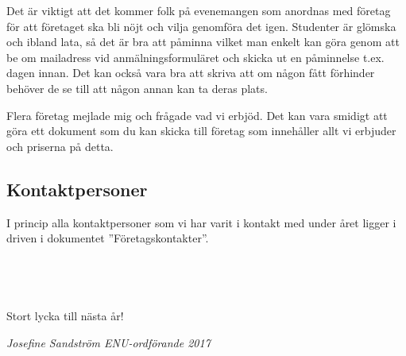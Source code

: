 \documentclass[10pt]{article}
\begin{document}
Det är viktigt att det kommer folk på evenemangen som anordnas med företag för att företaget ska
bli nöjt och vilja genomföra det igen. Studenter är glömska och ibland lata, så det är bra att påminna
vilket man enkelt kan göra genom att be om mailadress vid anmälningsformuläret och skicka ut en
påminnelse t.ex. dagen innan. Det kan också vara bra att skriva att om någon fått förhinder behöver
de se till att någon annan kan ta deras plats.

Flera företag mejlade mig och frågade vad vi erbjöd. Det kan vara smidigt att göra ett dokument som du kan skicka till företag som innehåller allt vi erbjuder och priserna på detta.

\subsection*{Kontaktpersoner}
I princip alla kontaktpersoner som vi har varit i kontakt med under året ligger i driven i dokumentet ''Företagskontakter''.\\
\\
\\
\\
\\

Stort lycka till nästa år!

\emph{Josefine Sandström \newline ENU-ordförande 2017}
\end{document}
